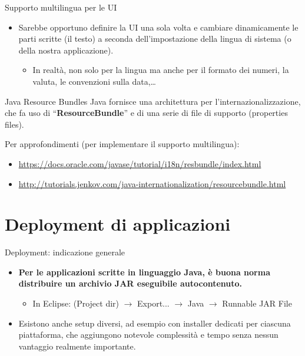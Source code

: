 \documentclass[presentation]{beamer}
\begin{document}
\begin{frame}{Supporto multilingua per le UI}
\begin{itemize}
\item Sarebbe opportuno definire la UI una sola volta e cambiare dinamicamente le parti scritte (il testo) a seconda dell'impostazione della lingua di sistema (o della nostra applicazione).
\begin{itemize}
\item In realtà, non solo per la lingua ma anche per il formato dei numeri, la valuta, le convenzioni sulla data,\dots
\end{itemize}
\end{itemize}
\begin{block}{Java Resource Bundles}
Java fornisce una architettura per l'internazionalizzazione, che fa uso di ``\textbf{ResourceBundle}'' e di una serie di file di supporto (properties files).

Per approfondimenti (per implementare il supporto multilingua):
\begin{itemize}
\item \url{https://docs.oracle.com/javase/tutorial/i18n/resbundle/index.html}
\item \url{http://tutorials.jenkov.com/java-internationalization/resourcebundle.html}
\end{itemize}
\end{block}
\end{frame}

\section{Deployment di applicazioni}

\begin{frame}{Deployment: indicazione generale}
\begin{itemize}\itemsep20pt
\item \textbf{Per le applicazioni scritte in linguaggio Java, è buona norma distribuire un archivio JAR eseguibile autocontenuto.}
\begin{itemize}
\item In Eclipse: (Project dir) $\rightarrow$ Export... $\rightarrow$ Java $\rightarrow$ Runnable JAR File
\end{itemize}
\item Esistono anche setup diversi, ad esempio con installer dedicati per ciascuna piattaforma, che aggiungono notevole complessità e tempo senza nessun vantaggio realmente importante.
\end{itemize}

\end{frame}
\end{document}
